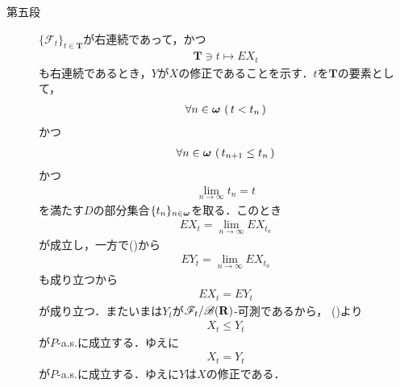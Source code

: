 \begin{sketch}
\begin{description}
			\item[第五段]
				$\{\mathscr{F}_t\}_{t \in \mathbf{T}}$が右連続であって，かつ
				\begin{align}
					\mathbf{T} \ni t \longmapsto EX_t
				\end{align}
				も右連続であるとき，$Y$が$X$の修正であることを示す．$t$を$\mathbf{T}$の要素として，
				\begin{align}
					\forall n \in {\boldsymbol \omega}\, \left(\, t < t_n\, \right)
				\end{align}
				かつ
				\begin{align}
					\forall n \in {\boldsymbol \omega}\, \left(\, t_{n+1} \leq t_n\, \right)
				\end{align}
				かつ
				\begin{align}
					\lim_{n \to \infty} t_n = t
				\end{align}
				を満たす$D$の部分集合$\{t_n\}_{n \in {\boldsymbol \omega}}$を取る．このとき
				\begin{align}
					EX_t = \lim_{n \to \infty} EX_{t_n}
				\end{align}
				が成立し，一方で()から
				\begin{align}
					EY_t = \lim_{n \to \infty} EX_{t_n}
				\end{align}
				も成り立つから
				\begin{align}
					EX_t = EY_t
				\end{align}
				が成り立つ．またいまは$Y_t$が$\mathscr{F}_t/\mathscr{B}(\mathbf{R})$-可測であるから，
				()より
				\begin{align}
					X_t \leq Y_t
				\end{align}
				が$P$-a.s.に成立する．ゆえに
				\begin{align}
					X_t = Y_t
				\end{align}
				が$P$-a.s.に成立する．ゆえに$Y$は$X$の修正である．
				\QED
		\end{description}
	\end{sketch}